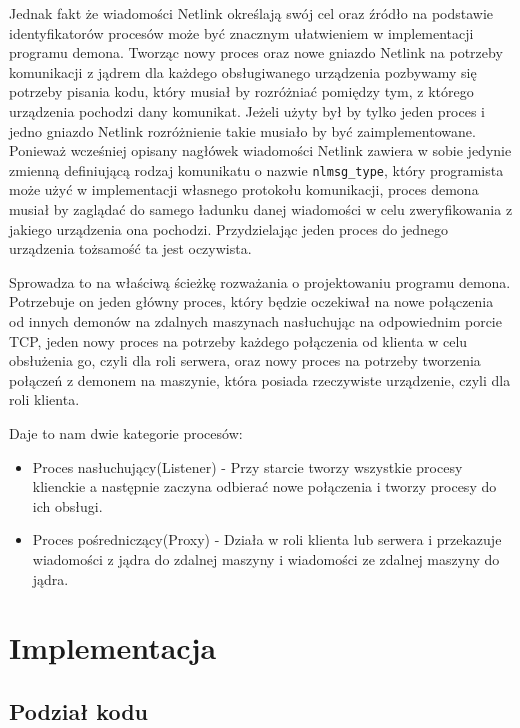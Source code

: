 \documentclass[11pt]{scrartcl}
\let\stdsection\section
\renewcommand\section{\newpage\stdsection}
\begin{document}
Jednak fakt że wiadomości Netlink określają swój cel oraz źródło na podstawie identyfikatorów procesów może być znacznym ułatwieniem w implementacji programu demona. Tworząc nowy proces oraz nowe gniazdo Netlink na potrzeby komunikacji z jądrem dla każdego obsługiwanego urządzenia pozbywamy się potrzeby pisania kodu, który musiał by rozróżniać pomiędzy tym, z którego urządzenia pochodzi dany komunikat. Jeżeli użyty był by tylko jeden proces i jedno gniazdo Netlink rozróżnienie takie musiało by być zaimplementowane. Ponieważ wcześniej opisany nagłówek wiadomości Netlink zawiera w sobie jedynie zmienną definiującą rodzaj komunikatu o nazwie \texttt{nlmsg\_type}, który programista może użyć w implementacji własnego protokołu komunikacji, proces demona musiał by zaglądać do samego ładunku danej wiadomości w celu zweryfikowania z jakiego urządzenia ona pochodzi. Przydzielając jeden proces do jednego urządzenia tożsamość ta jest oczywista.

Sprowadza to na właściwą ścieżkę rozważania o projektowaniu programu demona. Potrzebuje on jeden główny proces, który będzie oczekiwał na nowe połączenia od innych demonów na zdalnych maszynach nasłuchując na odpowiednim porcie TCP, jeden nowy proces na potrzeby każdego połączenia od klienta w celu obsłużenia go, czyli dla roli serwera, oraz nowy proces na potrzeby tworzenia połączeń z demonem na maszynie, która posiada rzeczywiste urządzenie, czyli dla roli klienta.

Daje to nam dwie kategorie procesów:

\begin{itemize}
\itemsep1pt\parskip0pt
\item
  Proces nasłuchujący(Listener) - Przy starcie tworzy wszystkie procesy klienckie a następnie zaczyna odbierać nowe połączenia i tworzy procesy do ich obsługi.
\item
  Proces pośredniczący(Proxy) - Działa w roli klienta lub serwera i przekazuje wiadomości z jądra do zdalnej maszyny i wiadomości ze zdalnej maszyny do jądra.
\end{itemize}

\section{Implementacja}

\subsection{Podział kodu}
\end{document}

